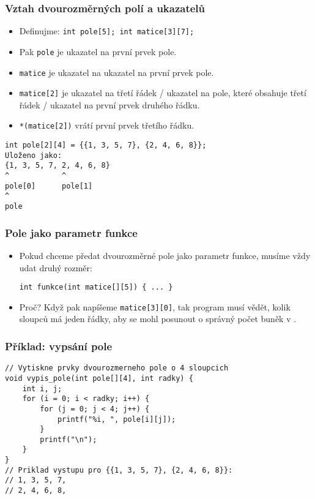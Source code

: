 \documentclass{beamer}
\newenvironment{itemizex}%
  {\large \begin{itemize}%
    \setlength{\itemsep}{8pt}%
    \setlength{\parskip}{8pt}}%
  {\end{itemize}}
\begin{document}
\begin{frame}[t,fragile]\frametitle{Vztah dvourozměrných polí a ukazatelů} 
    \begin{itemize}
        \item Definujme: \texttt{int pole[5]; int matice[3][7];}
        \item Pak \texttt{pole} je ukazatel na první prvek pole.
        \item \texttt{matice} je ukazatel na ukazatel na první prvek pole. 
        \item \texttt{matice[2]} je ukazatel na třetí řádek / ukazatel na pole, které obsahuje třetí řádek / ukazatel na první prvek druhého řádku.
        \item \texttt{*(matice[2])} vrátí první prvek třetího řádku. 
    \end{itemize}

\begin{verbatim}
int pole[2][4] = {{1, 3, 5, 7}, {2, 4, 6, 8}};
Uloženo jako:
{1, 3, 5, 7, 2, 4, 6, 8}
^            ^
pole[0]      pole[1]
^
pole
\end{verbatim}
\end{frame}


\begin{frame}[t,fragile]\frametitle{Pole jako parametr funkce} 
    \vskip 1cm
    \begin{itemizex}
        \item Pokud chceme předat dvourozměrné pole jako parametr funkce, musíme vždy udat druhý rozměr:
\begin{verbatim} 
int funkce(int matice[][5]) { ... }
\end{verbatim}
        \item Proč? Když pak napíšeme \texttt{matice[3][0]}, tak program musí vědět, kolik sloupců má jeden řádky, aby se mohl posunout o správný počet buněk v .
    \end{itemizex}
\end{frame}


\begin{frame}[t,fragile]\frametitle{Příklad: vypsání pole} 
\begin{verbatim} 
// Vytiskne prvky dvourozmerneho pole o 4 sloupcich
void vypis_pole(int pole[][4], int radky) {
    int i, j;
    for (i = 0; i < radky; i++) {
        for (j = 0; j < 4; j++) {
            printf("%i, ", pole[i][j]);
        }
        printf("\n");
    }
}
// Priklad vystupu pro {{1, 3, 5, 7}, {2, 4, 6, 8}}:
// 1, 3, 5, 7, 
// 2, 4, 6, 8, 
\end{verbatim}
\end{frame}
\end{document}
